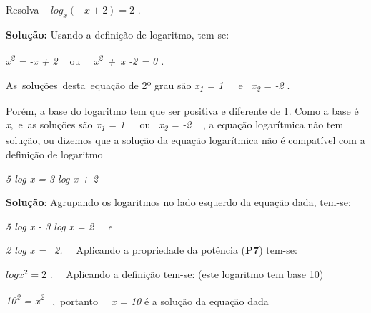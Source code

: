 \begin{texemplo}
    Resolva  ~  \( log_{x} \left( -x+2 \right) =2 \) .
    
    \textbf{Solução: }Usando a definição de logaritmo, tem-se:

    \textit{x\textsuperscript{2} = -x + 2 ~ }ou~~ \textit{x\textsuperscript{2}~+~x -2 = 0   .}

    As~soluções~desta~equação de 2º grau são    \textit{x\textsubscript{1} = 1}~~~e~  \textit{x\textsubscript{2} = -2} . 

    Porém, a base do logaritmo tem que ser positiva e diferente de 1. Como a base é \textit{x},~e~as soluções são   \textit{x\textsubscript{1} = 1}~~~ou~  \textit{x\textsubscript{2} = -2} ~ , a equação logarítmica não tem solução, ou dizemos que a solução da equação logarítmica não é compatível com a definição de logaritmo\qedsymbol{}
\end{texemplo}

\begin{texemplo}
\textit{5 log x = 3 log x + 2}

\textbf{Solução}: Agrupando os logaritmos no lado esquerdo da equação dada, tem-se:

\textit{5 log x - 3 log x = 2~~ e}

\textit{2 log x =~ 2.~~ \quad \quad }Aplicando a propriedade da potência (\textbf{P7}) tem-se:

 \( logx^{2} =2 \) .~~ \quad \quad Aplicando a definição tem-se: (este logaritmo tem base 10)

\textit{10\textsuperscript{2} = x\textsuperscript{2}}~ ,~portanto~~  \textit{x = 10} é a solução da equação dada \qedsymbol{}

\end{texemplo}

